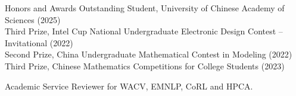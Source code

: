 \documentclass{resume}
\begin{document}
\begin{rSection}{Honors and Awards}
Outstanding Student, University of Chinese Academy of Sciences (2025)\\
Third Prize, Intel Cup National Undergraduate Electronic Design Contest -- Invitational (2022)\\
Second Prize, China Undergraduate Mathematical Contest in Modeling (2022)\\
Third Prize, Chinese Mathematics Competitions for College Students (2023)
\end{rSection}
\begin{rSection}{Academic Service}
Reviewer for WACV, EMNLP, CoRL and HPCA.
\end{rSection}
\end{document}
